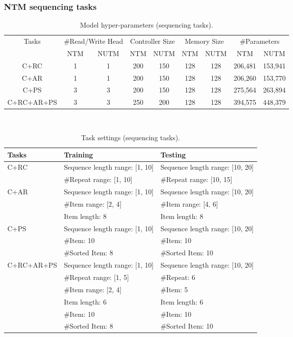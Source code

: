 \documentclass[english]{article}
\providecommand{\tabularnewline}{\\}
\begin{document}
\subsubsection{NTM sequencing tasks}

\begin{table}[H]
\begin{centering}
\begin{tabular}{ccccccccc}
\hline 
\multirow{2}{*}{Tasks} & \multicolumn{2}{c}{\#Read/Write Head} & \multicolumn{2}{c}{Controller Size} & \multicolumn{2}{c}{Memory Size} & \multicolumn{2}{c}{\#Parameters}\tabularnewline
\cline{2-9} 
 & NTM & NUTM & NTM & NUTM & NTM & NUTM & NTM & NUTM\tabularnewline
\hline 
C+RC & 1 & 1 & 200 & 150 & 128 & 128 & 206,481 & 153,941\tabularnewline
\hline 
C+AR & 1 & 1 & 200 & 150 & 128 & 128 & 206,260 & 153,770\tabularnewline
\hline 
C+PS & 3 & 3 & 200 & 150 & 128 & 128 & 275,564 & 263,894\tabularnewline
\hline 
C+RC+AR+PS & 3 & 3 & 250 & 200 & 128 & 128 & 394,575 & 448,379\tabularnewline
\hline 
\end{tabular}
\par\end{centering}
~

\caption{Model hyper-parameters (sequencing tasks).}
\end{table}
\begin{table}[H]
\begin{centering}
\begin{tabular}{lll}
\hline 
\multirow{1}{*}{Tasks} & Training & Testing\tabularnewline
\hline 
\multirow{2}{*}{C+RC} & Sequence length range: {[}1, 10{]} & Sequence length range: {[}10, 20{]}\tabularnewline
 & \#Repeat range: {[}1, 10{]} & \#Repeat range: {[}10, 15{]}\tabularnewline
\hline 
\multirow{3}{*}{C+AR} & Sequence length range: {[}1, 10{]} & Sequence length range: {[}10, 20{]}\tabularnewline
 & \#Item range: {[}2, 4{]} & \#Item range: {[}4, 6{]}\tabularnewline
 & Item length: 8 & Item length: 8\tabularnewline
\hline 
\multirow{3}{*}{C+PS} & Sequence length range: {[}1, 10{]} & Sequence length range: {[}10, 20{]}\tabularnewline
 & \#Item: 10 & \#Item: 10\tabularnewline
 & \#Sorted Item: 8 & \#Sorted Item: 10\tabularnewline
\hline 
\multirow{6}{*}{C+RC+AR+PS} & Sequence length range: {[}1, 10{]} & Sequence length range: {[}10, 20{]}\tabularnewline
 & \#Repeat range: {[}1, 5{]} & \#Repeat: 6\tabularnewline
 & \#Item range: {[}2, 4{]} & \#Item: 5\tabularnewline
 & Item length: 6 & Item length: 6\tabularnewline
 & \#Item: 10 & \#Item: 10\tabularnewline
 & \#Sorted Item: 8 & \#Sorted Item: 10\tabularnewline
\hline 
\end{tabular}
\par\end{centering}
~

\caption{Task settings (sequencing tasks).}
\end{table}
\end{document}
